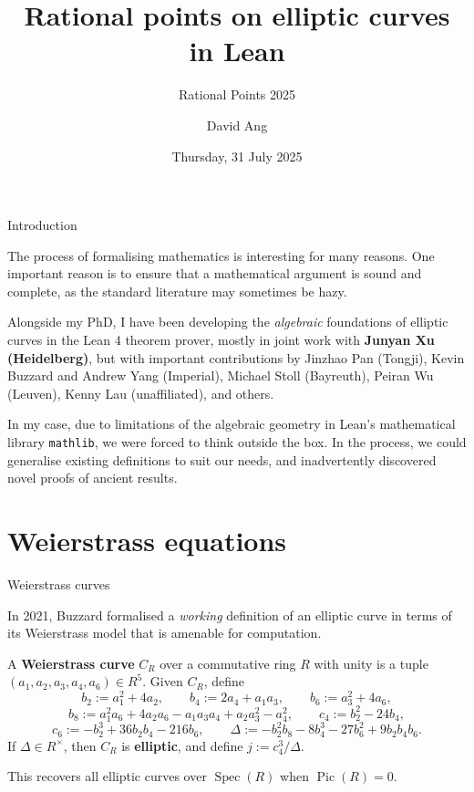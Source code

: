 \documentclass[10pt]{beamer}
\title{Rational points on elliptic curves in Lean}
\subtitle{Rational Points 2025}
\author{David Ang}
\institute{London School of Geometry and Number Theory}
\date{Thursday, 31 July 2025}
\begin{document}
\frame{\titlepage}

\begin{frame}[t]{Introduction}

The process of formalising mathematics is interesting for many reasons. One important reason is to ensure that a mathematical argument is sound and complete, as the standard literature may sometimes be hazy.

\vspace{0.5cm} Alongside my PhD, I have been developing the \emph{algebraic} foundations of elliptic curves in the Lean 4 theorem prover, mostly in joint work with \textbf{Junyan Xu (Heidelberg)}, but with important contributions by Jinzhao Pan (Tongji), Kevin Buzzard and Andrew Yang (Imperial), Michael Stoll (Bayreuth), Peiran Wu (Leuven), Kenny Lau (unaffiliated), and others.

\vspace{0.5cm} In my case, due to limitations of the algebraic geometry in Lean's mathematical library \texttt{mathlib}, we were forced to think outside the box. In the process, we could generalise existing definitions to suit our needs, and inadvertently discovered novel proofs of ancient results.

\end{frame}

\section{Weierstrass equations}

\begin{frame}[t]{Weierstrass curves}

In 2021, Buzzard formalised a \emph{working} definition of an elliptic curve in terms of its Weierstrass model that is amenable for computation.

\begin{definition}
A \textbf{Weierstrass curve} $ C_R $ over a commutative ring $ R $ with unity is a tuple $ (a_1, a_2, a_3, a_4, a_6) \in R^5 $. Given $ C_R $, define
$$ b_2 := a_1^2 + 4a_2, \qquad b_4 := 2a_4 + a_1a_3, \qquad b_6 := a_3^2 + 4a_6, $$
$$ b_8 := a_1^2a_6 + 4a_2a_6 - a_1a_3a_4 + a_2a_3^2 - a_4^2, \qquad c_4 := b_2^2 - 24b_4, $$
$$ c_6 := -b_2^3 + 36b_2b_4 - 216b_6, \qquad \Delta := -b_2^2b_8 - 8b_4^3 - 27b_6^2 + 9b_2b_4b_6. $$
If $ \Delta \in R^\times $, then $ C_R $ is \textbf{elliptic}, and define $ j := c_4^3 / \Delta $.
\end{definition}

This recovers all elliptic curves over $ \operatorname{Spec}(R) $ when $ \operatorname{Pic}(R) = 0 $.

\end{frame}
\end{document}
